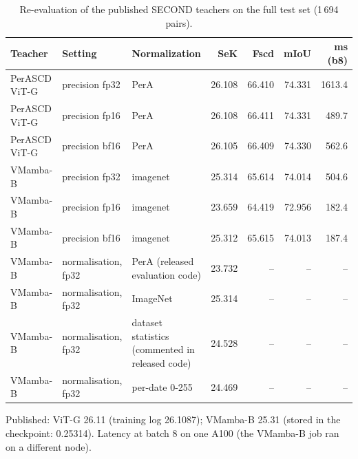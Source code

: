 \begin{table}[!t]
\centering
\footnotesize
\caption{Re-evaluation of the published SECOND teachers on the full test set (1\,694 pairs).}
\label{tab:s-teacher-repro}
\begin{tabular}{lllrrrr}
\toprule
Teacher & Setting & Normalization & SeK & Fscd & mIoU & ms (b8) \\
\midrule
PerASCD ViT-G & precision fp32 & PerA & 26.108 & 66.410 & 74.331 & 1613.4 \\
PerASCD ViT-G & precision fp16 & PerA & 26.108 & 66.411 & 74.331 & 489.7 \\
PerASCD ViT-G & precision bf16 & PerA & 26.105 & 66.409 & 74.330 & 562.6 \\
VMamba-B & precision fp32 & imagenet & 25.314 & 65.614 & 74.014 & 504.6 \\
VMamba-B & precision fp16 & imagenet & 23.659 & 64.419 & 72.956 & 182.4 \\
VMamba-B & precision bf16 & imagenet & 25.312 & 65.615 & 74.013 & 187.4 \\
VMamba-B & normalisation, fp32 & PerA (released evaluation code) & 23.732 & -- & -- & -- \\
VMamba-B & normalisation, fp32 & ImageNet & 25.314 & -- & -- & -- \\
VMamba-B & normalisation, fp32 & dataset statistics (commented in released code) & 24.528 & -- & -- & -- \\
VMamba-B & normalisation, fp32 & per-date 0-255 & 24.469 & -- & -- & -- \\
\bottomrule
\end{tabular}
\par\smallskip\parbox{\linewidth}{\scriptsize Published: ViT-G 26.11 (training log 26.1087); VMamba-B 25.31 (stored in the checkpoint: 0.25314). Latency at batch 8 on one A100 (the VMamba-B job ran on a different node).}
\end{table}
